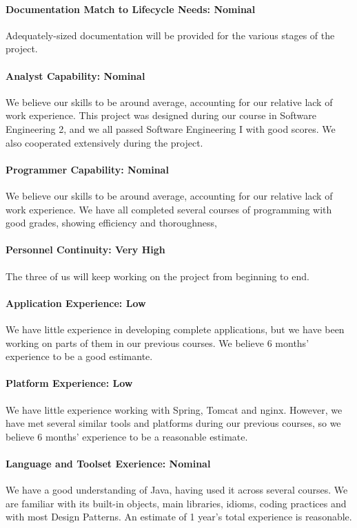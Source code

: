 \paragraph*{Documentation Match to Lifecycle Needs: Nominal}
Adequately-sized documentation will be provided for the various stages of the project.

\paragraph*{Analyst Capability: Nominal}
We believe our skills to be around average, accounting for our relative lack of work experience. This project was designed during our course in Software Engineering 2, and we all passed Software Engineering I with good scores. We also cooperated extensively during the project.

\paragraph*{Programmer Capability: Nominal}
We believe our skills to be around average, accounting for our relative lack of work experience. We have all completed several courses of programming with good grades, showing efficiency and thoroughness,

\paragraph*{Personnel Continuity: Very High}
The three of us will keep working on the project from beginning to end.

\paragraph*{Application Experience: Low}
We have little experience in developing complete applications, but we have been working on parts of them in our previous courses. We believe 6 months' experience to be a good estimante.

\paragraph*{Platform Experience: Low}
We have little experience working with Spring, Tomcat and nginx. However, we have met several similar tools and platforms during our previous courses, so we believe 6 months' experience to be a reasonable estimate.

\paragraph*{Language and Toolset Exerience: Nominal}
We have a good understanding of Java, having used it across several courses. We are familiar with its built-in objects, main libraries, idioms, coding practices and with most Design Patterns. An estimate of 1 year's total experience is reasonable.

